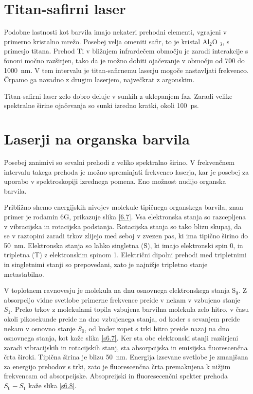 \section{Titan-safirni laser}

Podobne lastnosti kot barvila imajo nekateri prehodni elementi, vgrajeni v
primerno kristalno mrežo. Posebej velja omeniti safir, to je kristal Al$_2$O%
$_3$, s primesjo titana. Prehod Ti v bližnjem infrardečem območju je
zaradi interakcije s fononi močno razširjen, tako da je možno dobiti
ojačevanje v območju od 700 do 1000~nm. V tem intervalu je titan-safirnemu
laserju mogoče nastavljati frekvenco. Črpamo ga navadno z drugim laserjem,
največkrat z argonskim.

Titan-safirni laser zelo dobro deluje v sunkih z uklepanjem faz. Zaradi
velike spektralne širine ojačevanja so sunki izredno kratki, okoli 100~ps.


\section{Laserji na organska barvila}

Posebej zanimivi so sevalni prehodi z veliko spektralno širino. V
frekvenčnem intervalu takega prehoda je možno spreminjati frekvenco
laserja, kar je posebej za uporabo v spektroskopiji izrednega pomena. Eno
možnost nudijo organska barvila.

Približno shemo energijskih nivojev molekule tipičnega organskega barvila,
znan primer je rodamin 6G, prikazuje slika \ref{6.7}. Vsa elektronska stanja
so razcepljena v vibracijska in rotacijska podstanja. Rotacijska stanja so
tako blizu skupaj, da se v raztopini zaradi trkov zlijejo med seboj v zvezen
pas, ki ima tipično širino do 50~nm. Elektronska stanja so lahko singletna
(S), ki imajo elektronski spin 0, in tripletna (T) z elektronskim spinom 1.
Električni dipolni prehodi med tripletnimi in singletnimi stanji so
prepovedani, zato je najnižje tripletno stanje metastabilno.

V toplotnem ravnovesju je molekula na dnu osnovnega elektronskega stanja S$_0
$. Z absorpcijo vidne svetlobe primerne frekvence preide v nekam v vzbujeno
stanje $S_1$. Preko trkov z molekulami topila vzbujena barvilna molekula
zelo hitro, v času okoli pikosekunde preide na dno vzbujenega stanja, od
koder s sevanjem preide nekam v osnovno stanje $S_0$, od koder zopet s trki
hitro preide nazaj na dno osnovnega stanja, kot kaže slika \ref{s6.7}. Ker
sta obe elektronski stanji razširjeni zaradi vibracijskih in rotacijskih
stanj, sta absorpcijska in emisijska fluorescenčna črta široki. Tipična
širina je blizu 50~nm. Energija izsevane svetlobe je zmanjšana za energijo
prehodov s trki, zato je fluorescenčna črta premaknjena k nižjim
frekvencam od absorpcijske. Absoprcijski in fluoresecenčni spekter prehoda $%
S_0-S_1$ kaže slika \ref{s6.8}.

